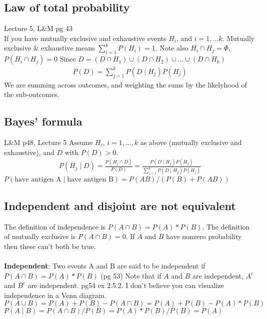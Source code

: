 \subsection{Law of total probability} {\tiny Lecture 5, L\&M pg 43}   \hfill \\
 If you have mutually exclusive and exhaustive events $H_i$, and $i = 1, \dots k$.  Mutually exclusive \& exhaustive means $\sum_{i=1}^k P(H_i) = 1$.  Note also $H_i \cap H_j = \Phi$, $P(H_i \cap H_j) = 0$  
 Since $D = (D \cap H_1) \cup (D \cap H_2) \cup \dots \cup  (D \cap H_k)$
	\begin{align*}
 		P(D) = \sum_{j=1}^k P(D \mid H_j) P(H_j) 
  	\end{align*}
We are summing across outcomes, and weighting the sums by the likelyhood of the sub-outcomes.
 
 \subsection{Bayes' formula} {\tiny L\&M p48, Lecture 5}
 Assume $H_i$, $i = 1, \dots, k$ as above (mutually exclusive and exhaustive), and $D$ with $P(D) > 0$.
 	\begin{align*}
		P(H_j \mid D) = \frac{P(H_j \cap D)}{P(D)} = \frac{P(D \mid H_j) P(H_j) }{\sum_{i=1}^k P(D \mid H_j) P(H_j) }
	\end{align*}
$P(\mbox{have antigen A} \mid \mbox{have antigen B}) = P(AB)/(P(B) + P(AB)) $
	

\subsection{Independent and disjoint are not equivalent}
The definition of independence is $P(A \cap B) = P(A)*P(B)$.  The definition of mutually exclusive is $P(A \cap B) = 0$.   If $A$ and $B$ have nonzero probability then these can't both be true.  \hfill \\
\hfill \\

\textbf{Independent}: Two events A and B are said to be independent if $P(A \cap B) = P(A)*P(B)$ {\tiny (pg 53)} Note that if $A$ and $B$ are independent, $A^c$ and $B^c$ are independent. {\tiny pg54 ex 2.5.2.}  I don't believe you can visualize independence in a Venn diagram. \hfill \\ 
$P(A \cup B) = P(A) + P(B) - P(A \cap B) = P(A) + P(B) - P(A)*P(B)$ \hfill \\
$P(A \mid B) = P(A \cap B)/P(B) = P(A)*P(B)/P(B) = P(A)$ \hfill \\

